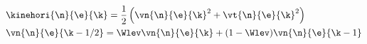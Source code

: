 $$\begin{aligned}
    &\kinehori{\n}{\e}{\k} = \frac{1}{2} \left( \vn{\n}{\e}{\k}^2 + \vt{\n}{\e}{\k}^2 \right) \\
    &\vn{\n}{\e}{\k-1/2} = \Wlev \vn{\n}{\e}{\k} + (1 - \Wlev) \vn{\n}{\e}{\k-1}
\end{aligned}$$